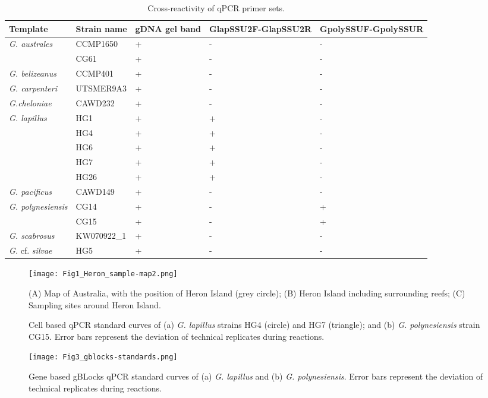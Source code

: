 \documentclass[12pt]{article}
\begin{document}
\begin{table}
\caption{Cross-reactivity of qPCR primer sets.}
\label{tbl:CrossreactTable}
\begin{tabular}{ | p{4cm} | p{3cm} | p{2cm} | p{2.5cm} | p{2.5cm} | }
\hline
\textbf{Template} & \textbf{Strain name} & \textbf{gDNA gel band} & \textbf{GlapSSU2F-GlapSSU2R} & \textbf{GpolySSUF-GpolySSUR} \\
\hline
\emph{G. australes} & CCMP1650 &+&-&- \\
\hline
& CG61 &+&-&- \\
\hline
\emph{G. belizeanus}&CCMP401&+&-&-\\
\hline
\emph{G. carpenteri}&UTSMER9A3&+&-&-\\
\hline
\emph{G.cheloniae}&CAWD232&+&-&-\\
\hline
\emph{G. lapillus}&HG1&+&+&-\\
\hline
&HG4&+&+&-\\
\hline
&HG6&+&+&-\\
\hline
&HG7&+&+&-\\
\hline
&HG26&+&+&-\\
\hline
\emph{G. pacificus}&CAWD149&+&-&-\\
\hline
\emph{G. polynesiensis}&CG14&+&-&+\\
\hline
&CG15&+&-&+\\
\hline
\emph{G. scabrosus}&KW070922\_1&+&-&-\\
\hline
\emph{G.} cf. \emph{silvae}&HG5&+&-&-\\
\hline
\end{tabular}
\end{table}
\FloatBarrier
\begin{figure} 
\texttt{[image: Fig1\_Heron\_sample-map2.png]} 
\caption{(A) Map of Australia, with the position of Heron Island (grey circle); (B) Heron Island including surrounding reefs; (C) Sampling sites around Heron Island.} 
\label{fig:samplesites}
\end{figure} 
\FloatBarrier
\begin{figure}
\caption{Cell based qPCR standard curves of (a) \emph{G. lapillus} strains HG4 (circle) and HG7 (triangle); and (b) \emph{G. polynesiensis} strain CG15. Error bars represent the deviation of technical replicates during reactions.}
\label{fig:stdCurve}
\end{figure} 
\FloatBarrier
\begin{figure}
\texttt{[image: Fig3\_gblocks-standards.png]}
\caption{Gene based gBLocks qPCR standard curves of (a) \emph{G. lapillus} and (b) \emph{G. polynesiensis}. Error bars represent the deviation of technical replicates during reactions.} %
\label{fig:lapigblocks}
\end{figure}
\end{document}
